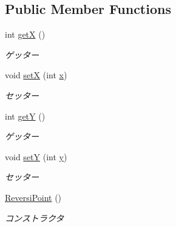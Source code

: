 \subsection*{Public Member Functions}
\begin{DoxyCompactItemize}
\item 
int \hyperlink{classjp_1_1gr_1_1java__conf_1_1yuta__yoshinaga_1_1reversi_1_1model_1_1_reversi_point_ae95551c470eb4dd9dd21547fa479aee9}{getX} ()
\begin{DoxyCompactList}\small\item\em ゲッター \end{DoxyCompactList}\item 
void \hyperlink{classjp_1_1gr_1_1java__conf_1_1yuta__yoshinaga_1_1reversi_1_1model_1_1_reversi_point_a24da8d887cae320a2ca8b4c80665227c}{setX} (int \hyperlink{classjp_1_1gr_1_1java__conf_1_1yuta__yoshinaga_1_1reversi_1_1model_1_1_reversi_point_af41c34bc1ea9531eb815cfc74bccd0c1}{x})
\begin{DoxyCompactList}\small\item\em セッター \end{DoxyCompactList}\item 
int \hyperlink{classjp_1_1gr_1_1java__conf_1_1yuta__yoshinaga_1_1reversi_1_1model_1_1_reversi_point_a798959fea536c8bbbcaa9e7b447037ea}{getY} ()
\begin{DoxyCompactList}\small\item\em ゲッター \end{DoxyCompactList}\item 
void \hyperlink{classjp_1_1gr_1_1java__conf_1_1yuta__yoshinaga_1_1reversi_1_1model_1_1_reversi_point_a7ba3fb3aedb0d02d79ec62f4645bb8cf}{setY} (int \hyperlink{classjp_1_1gr_1_1java__conf_1_1yuta__yoshinaga_1_1reversi_1_1model_1_1_reversi_point_a39c67072f0ee5bcf0b8c6c03b1c10ed8}{y})
\begin{DoxyCompactList}\small\item\em セッター \end{DoxyCompactList}\item 
\hyperlink{classjp_1_1gr_1_1java__conf_1_1yuta__yoshinaga_1_1reversi_1_1model_1_1_reversi_point_a0d214a37c3858ca54e26cc6d5adb2c0b}{Reversi\+Point} ()
\begin{DoxyCompactList}\small\item\em コンストラクタ \end{DoxyCompactList}\end{DoxyCompactItemize}
